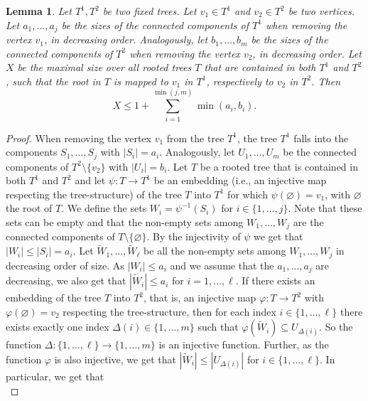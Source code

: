 \documentclass[11pt]{article}
\numberwithin{equation}{section}
\newtheorem{lemma}[theorem]{Lemma}
\theoremstyle{definition}
\begin{document}
\begin{lemma}\label{lem:point removal}
    Let $T^1, T^2$ be two fixed trees. Let $v_1 \in T^1$ and $v_2 \in T^2$ be two vertices. Let $a_1,\ldots,a_j$ be the sizes of the connected components of $T^1$ when removing the vertex $v_1$, in decreasing order. Analogously, let $b_1,\ldots,b_m$ be the sizes of the connected components of $T^2$ when removing the vertex $v_2$, in decreasing order.
    Let $X$ be the maximal size over all rooted trees $T$ that are contained in both $T^1$ and $T^2$, such that the root in $T$ is mapped to $v_1$ in $T^1$, respectively to $v_2$ in $T^2$. Then
    \begin{equation*}
        X\leq 1+\sum_{i=1}^{\min(j,m)} \min(a_i,b_i).
    \end{equation*}
\end{lemma}
\begin{proof}
    When removing the vertex $v_1$ from the tree $T^1$, the tree $T^1$ falls into the components $S_1,\ldots,S_j$ with $|S_i| = a_i$. Analogously, let $U_1,\ldots,U_m$ be the connected components of $T^2\setminus\{v_2\}$ with $|U_i| = b_i$.  Let $T$ be a rooted tree that is contained in both $T^1$ and $T^2$ and let $\psi:T\to T^1$ be an embedding (i.e., an injective map respecting the tree-structure) of the tree $T$ into $T^1$ for which $\psi(\varnothing)=v_1$, with $\varnothing$ the root of $T$. We define the sets $W_i=\psi^{-1} (S_i)$ for $i\in \{1,\ldots,j\}$.  Note that these sets can be empty and that the non-empty sets among $W_1,\ldots,W_j$ are the connected components of $T\setminus\{\varnothing\}$. By the injectivity of $\psi$ we get that $|W_i|\leq |S_i|= a_i$. Let $\widetilde{W}_1,\ldots,\widetilde{W}_\ell$ be all the non-empty sets among $W_1,\ldots,W_j$ in decreasing order of size. As $|W_i|\leq a_i$ and we assume that the $a_1,\ldots,a_j$ are decreasing, we also get that $|\widetilde{W}_i|\leq a_i$ for $i=1,\ldots,\ell$.
    If there exists an embedding of the tree $T$ into $T^2$, that is, an injective map $\varphi:T \to T^2$ with $\varphi(\varnothing)=v_2$ respecting the tree-structure, then for each index $i\in \{1,\ldots,\ell\}$ there exists exactly one index $\Delta(i) \in \{1,\ldots,m\}$ such that $\varphi(\widetilde{W}_i)\subseteq U_{\Delta(i)}$. So the function $\Delta:\{1,\ldots,\ell \} \to \{ 1,\ldots,m\}$ is an injective function. Further, as the function $\varphi$ is also injective, we get that $|\widetilde{W}_i| \leq |U_{\Delta(i)}|$ for $i \in \{1, \ldots,\ell \}$. In particular, we get that
    \begin{equation*}

\end{equation*}
\end{proof}
\end{document}

